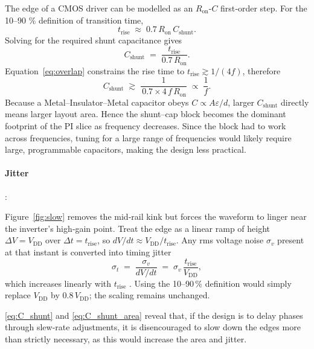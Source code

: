 The edge of a CMOS driver can be modelled as an \(R_{\text{on}}\)-\(C\) first‑order step.  
For the 10--90 \% definition of transition time,
\[
  t_{\text{rise}}\;\approx\;0.7\,R_{\text{on}}\,C_{\text{shunt}}.
\]
Solving for the required shunt capacitance gives  
\[
  C_{\text{shunt}} \;=\; \frac{t_{\text{rise}}}{0.7\,R_{\text{on}}}.
  \label{eq:C_shunt_area}
\]
Equation~\eqref{eq:overlap} constrains the rise time to
\(t_{\text{rise}}\gtrsim 1/(4f)\), therefore  
\[
  C_{\text{shunt}}
  \;\gtrsim\; 
  \frac{1}{\,0.7 \times 4\,f\,R_{\text{on}}}
  \;\propto\;\frac{1}{f}.
  \label{eq:C_shunt}
\]
Because a Metal–Insulator–Metal capacitor obeys \(C\propto A\varepsilon/d\),
larger \(C_{\text{shunt}}\) directly means larger layout area.  
Hence the shunt–cap block becomes the dominant footprint of the PI slice as frequency decreases. 
Since the block had to work across frequencies, tuning for a large range of frequencies would likely require large, programmable capacitors, making the design less practical.

\paragraph{Jitter}:

Figure~\ref{fig:slow} removes the mid‑rail kink but forces the waveform to
linger near the inverter’s high‑gain point.  Treat the edge as a linear ramp
of height \(\Delta V = V_{\text{DD}}\) over
\(\Delta t = t_{\text{rise}}\), so
\(dV/dt \approx V_{\text{DD}}/t_{\text{rise}}\).
Any rms voltage noise \(\sigma_v\) present at that instant is converted into
timing jitter
\[
  \sigma_t
  \;=\;
  \frac{\sigma_v}{dV/dt}
  \;=\;
  \sigma_v \,\frac{t_{\text{rise}}}{V_{\text{DD}}},
\]
which increases linearly with \(t_{\text{rise}}\)
\cite{TektronixJitterPrimer2012}.  Using the 10--90\,\% definition would simply
replace \(V_{\text{DD}}\) by \(0.8\,V_{\text{DD}}\); the scaling remains
unchanged.

\ref{eq:C_shunt} and \ref{eq:C_shunt_area} reveal that, if the design is to delay phases through slew-rate adjustments, it is disencouraged to slow down the edges more than strictly necessary, as this would increase the area and jitter.

